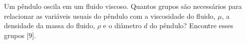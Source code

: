 Um pêndulo oscila em um fluido viscoso. Quantos grupos são necessários para relacionar as variáveis usuais do pêndulo com a viscosidade do fluido, $\mu$, a densidade da massa do fluido, $\rho$ e o diâmetro $d$ do pêndulo? Encontre esses grupos [9].
